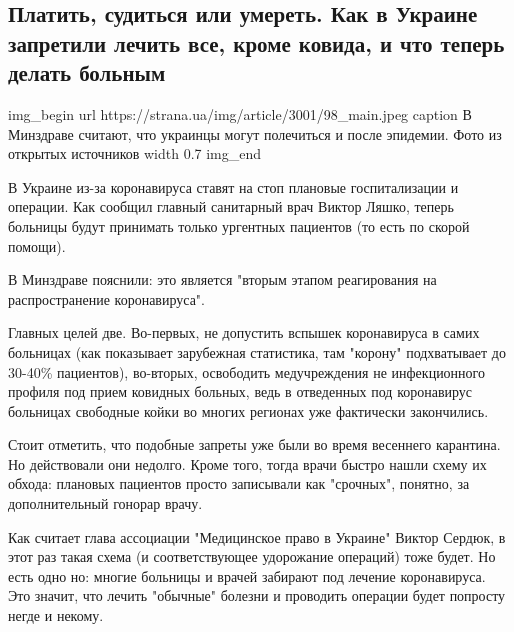  
 
 

\subsection{Платить, судиться или умереть. Как в Украине запретили лечить все, кроме ковида, и что теперь делать больным}


\ifcmt
img_begin 
  url https://strana.ua/img/article/3001/98_main.jpeg
  caption В Минздраве считают, что украинцы могут полечиться и после эпидемии. Фото из открытых источников 
  width 0.7
img_end
\fi

В Украине из-за коронавируса ставят на стоп плановые госпитализации и операции.
Как сообщил главный санитарный врач Виктор Ляшко, теперь больницы будут
принимать только ургентных пациентов (то есть по скорой помощи). 

В Минздраве пояснили: это является "вторым этапом реагирования на
распространение коронавируса".

Главных целей две. Во-первых, не допустить вспышек коронавируса в самих
больницах (как показывает зарубежная статистика, там "корону" подхватывает до
30-40\% пациентов), во-вторых, освободить медучреждения не инфекционного
профиля под прием ковидных больных, ведь в отведенных под коронавирус больницах
свободные койки во многих регионах уже фактически закончились.

Стоит отметить, что подобные запреты уже были во время весеннего карантина. Но
действовали они недолго. Кроме того, тогда врачи быстро нашли схему их обхода:
плановых пациентов просто записывали как "срочных", понятно, за дополнительный
гонорар врачу.

Как считает глава ассоциации "Медицинское право в Украине" Виктор Сердюк, в
этот раз такая схема (и соответствующее удорожание операций) тоже будет. Но
есть одно но: многие больницы и врачей забирают под лечение коронавируса. Это
значит, что лечить "обычные" болезни и проводить операции будет попросту негде
и некому.

